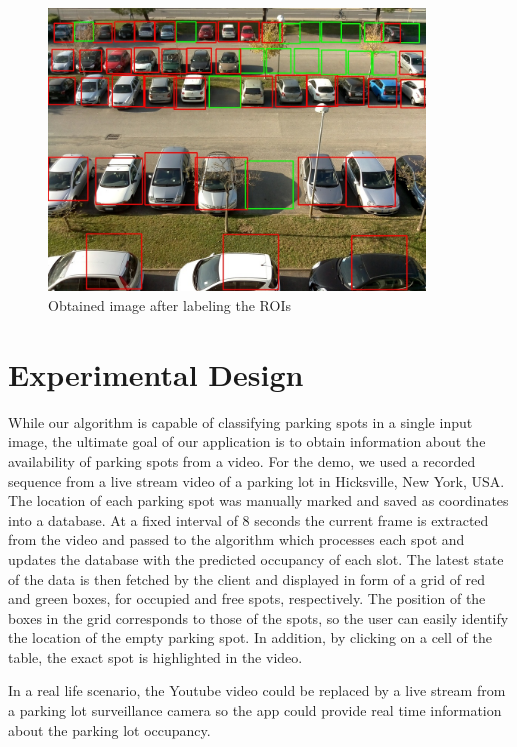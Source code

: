 \documentclass[runningheads,a4paper,11pt]{report}
\begin{document}
\begin{figure}[htbp]
	\centerline{\includegraphics[width=10cm]{images/2015-11-12_0947}}   
	\caption{Obtained image after labeling the ROIs}
	\label{fig:resultimg}
\end{figure}

\section{Experimental Design}
\label{section:experimentaldesign}

While our algorithm is capable of classifying parking spots in a single input image, the ultimate goal of our application is to obtain information about the availability of parking spots from a video. 
For the demo, we used a recorded sequence from a live stream video of a parking lot in Hicksville, New York, USA. The location of each parking spot was manually marked and saved as coordinates into a database. 
At a fixed interval of 8 seconds the current frame is extracted from the video and passed to the algorithm which processes each spot and updates the database with the predicted occupancy of each slot.
The latest state of the data is then fetched by the client and displayed in form of a grid of red and green boxes, for occupied and free spots, respectively. 
The position of the boxes in the grid corresponds to those of the spots, so the user can easily identify the location of the empty parking spot. In addition, by clicking on a cell of the table, the exact spot is highlighted in the video.

In a real life scenario, the Youtube video could be replaced by a live stream from a parking lot surveillance camera so the app could provide real time information about the parking lot occupancy.

\clearpage
\end{document}
